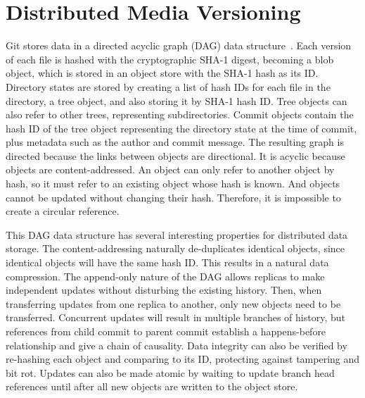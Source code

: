 \section{Distributed Media Versioning}


Git stores data in a directed acyclic graph (DAG) data structure~\cite{git_initial_readme}.
Each version of each file is hashed with the cryptographic SHA-1 digest, becoming a blob object, which is stored in an object store with the SHA-1 hash as its ID.
Directory states are stored by creating a list of hash IDs for each file in the directory, a tree object, and also storing it by SHA-1 hash ID.
Tree objects can also refer to other trees, representing subdirectories.
Commit objects contain the hash ID of the tree object representing the directory state at the time of commit, plus metadata such as the author and commit message.
The resulting graph is directed because the links between objects are directional.
It is acyclic because objects are content-addressed.
An object can only refer to another object by hash, so it must refer to an existing object whose hash is known.
And objects cannot be updated without changing their hash.
Therefore, it is impossible to create a circular reference.

This DAG data structure has several interesting properties for distributed data storage.
The content-addressing naturally de-duplicates identical objects, since identical objects will have the same hash ID.
This results in a natural data compression.
The append-only nature of the DAG allows replicas to make independent updates without disturbing the existing history.
Then, when transferring updates from one replica to another, only new objects need to be transferred.
Concurrent updates will result in multiple branches of history, but references from child commit to parent commit establish a happens-before relationship and give a chain of causality.
Data integrity can also be verified by re-hashing each object and comparing to its ID, protecting against tampering and bit rot.
Updates can also be made atomic by waiting to update branch head references until after all new objects are written to the object store.

